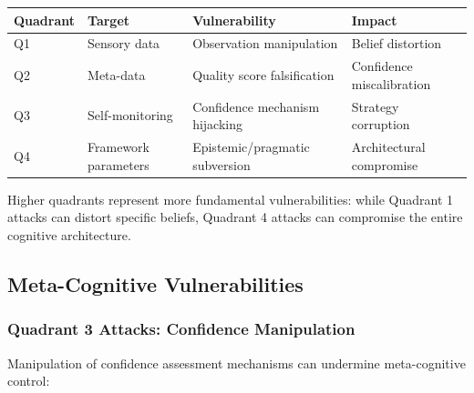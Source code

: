 \documentclass[
]{article}
\newcounter{none} %
\begin{document}
{\def\LTcaptype{none} %
\begin{longtable}[]{@{}
  >{\raggedright\arraybackslash}p{}
  >{\raggedright\arraybackslash}p{}
  >{\raggedright\arraybackslash}p{}
  >{\raggedright\arraybackslash}p{}@{}}
\toprule\noalign{}
\begin{minipage}[b]{\linewidth}\raggedright
Quadrant
\end{minipage} & \begin{minipage}[b]{\linewidth}\raggedright
Target
\end{minipage} & \begin{minipage}[b]{\linewidth}\raggedright
Vulnerability
\end{minipage} & \begin{minipage}[b]{\linewidth}\raggedright
Impact
\end{minipage} \\
\midrule\noalign{}
\endhead
\bottomrule\noalign{}
\endlastfoot
Q1 & Sensory data & Observation manipulation & Belief distortion \\
Q2 & Meta-data & Quality score falsification & Confidence
miscalibration \\
Q3 & Self-monitoring & Confidence mechanism hijacking & Strategy
corruption \\
Q4 & Framework parameters & Epistemic/pragmatic subversion &
Architectural compromise \\
\end{longtable}
}

Higher quadrants represent more fundamental vulnerabilities: while
Quadrant 1 attacks can distort specific beliefs, Quadrant 4 attacks can
compromise the entire cognitive architecture.

\subsection{Meta-Cognitive Vulnerabilities}\label{sec:vulnerabilities}

\subsubsection{Quadrant 3 Attacks: Confidence
Manipulation}\label{quadrant-3-attacks-confidence-manipulation}

Manipulation of confidence assessment mechanisms can undermine
meta-cognitive control:
\end{document}
